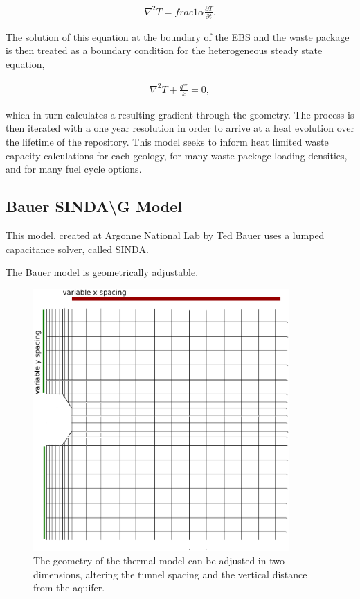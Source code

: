 {\begin{align}
  \nabla^2T  = frac{1}{\alpha}\frac{\partial T}{\partial t}.
  \label{condGl}
\end{align}

The solution of this equation at the boundary of the EBS and the waste package 
is then treated as a boundary condition for the heterogeneous steady state 
equation, 

\begin{align}
  \nabla^2T + \frac{q'''}{k} = 0,
  \label{condGeneral}
\end{align}


which in turn calculates a resulting gradient through the geometry. The 
process is then iterated with a one year resolution in order to arrive at a heat 
evolution over  the lifetime of the repository. This model seeks to inform heat
limited waste capacity calculations for each geology, for many waste package 
loading densities, and for many fuel cycle options.  


\subsection{Bauer SINDA\textbackslash G Model}

This model, created at Argonne National Lab by Ted Bauer uses a lumped 
capacitance solver, called SINDA.

The Bauer model is geometrically adjustable. 

\begin{figure}[htbp!]
  \begin{center}
    \includegraphics[height=10cm]{./chapters/current/sindageom.eps}
  \end{center}
  \caption{The geometry of the thermal model can be adjusted in two dimensions, 
  altering the tunnel spacing and the vertical distance from the aquifer.}
  \label{fig:sindageom}
\end{figure}

}
